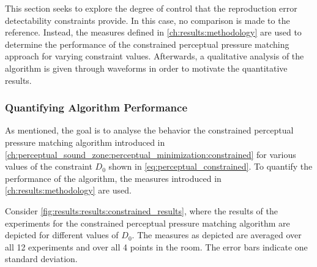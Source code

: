 This section seeks to explore the degree of control that the reproduction error detectability constraints provide.
In this case, no comparison is made to the reference.
Instead, the measures defined in \autoref{ch:results:methodology} are used to determine the performance of the 
constrained perceptual pressure matching approach for varying constraint values.
Afterwards, a qualitative analysis of the algorithm is given through waveforms in order to motivate the quantitative results.

\subsubsection*{Quantifying Algorithm Performance}

As mentioned, the goal is to analyse the behavior the constrained perceptual pressure matching algorithm
introduced in \autoref{ch:perceptual_sound_zone:perceptual_minimization:constrained} for various values of the 
constraint $D_0$ shown in \autoref{eq:perceptual_constrained}. 
To quantify the performance of the algorithm, the measures introduced in \autoref{ch:results:methodology} are used.

Consider \autoref{fig:results:results:constrained_results}, where the results of the 
experiments for the constrained perceptual pressure matching algorithm are depicted for different values of $D_0$. 
The measures as depicted are averaged over all 12 experiments and over all 4 points in the room. 
The error bars indicate one standard deviation.

